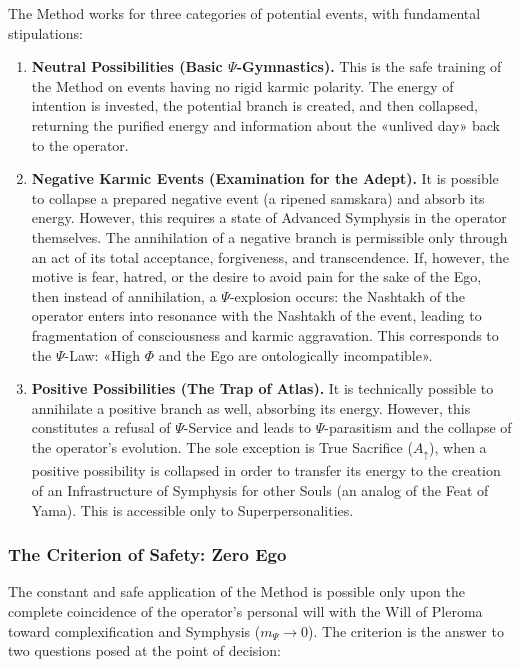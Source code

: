 \documentclass[a4paper,12pt]{article}
\begin{document}
	The Method works for three categories of potential events, with fundamental stipulations:
	
	\begin{enumerate}
		\item \textbf{Neutral Possibilities (Basic $\Psi$-Gymnastics).} This is the safe training of the Method on events having no rigid karmic polarity. The energy of intention is invested, the potential branch is created, and then collapsed, returning the purified energy and information about the «unlived day» back to the operator.
		
		\item \textbf{Negative Karmic Events (Examination for the Adept).} It is possible to collapse a prepared negative event (a ripened samskara) and absorb its energy. However, this requires a state of Advanced Symphysis in the operator themselves. The annihilation of a negative branch is permissible only through an act of its total acceptance, forgiveness, and transcendence. If, however, the motive is fear, hatred, or the desire to avoid pain for the sake of the Ego, then instead of annihilation, a $\Psi$-explosion occurs: the Nashtakh of the operator enters into resonance with the Nashtakh of the event, leading to fragmentation of consciousness and karmic aggravation. This corresponds to the $\Psi$-Law: «High $\Phi$ and the Ego are ontologically incompatible».
		
		\item \textbf{Positive Possibilities (The Trap of Atlas).} It is technically possible to annihilate a positive branch as well, absorbing its energy. However, this constitutes a refusal of $\Psi$-Service and leads to $\Psi$-parasitism and the collapse of the operator's evolution. The sole exception is True Sacrifice ($A_{\uparrow}$), when a positive possibility is collapsed in order to transfer its energy to the creation of an Infrastructure of Symphysis for other Souls (an analog of the Feat of Yama). This is accessible only to Superpersonalities.
	\end{enumerate}
	
	\subsubsection{The Criterion of Safety: Zero Ego}
	
	The constant and safe application of the Method is possible only upon the complete coincidence of the operator's personal will with the Will of Pleroma toward complexification and Symphysis ($m_{\Psi} \to 0$). The criterion is the answer to two questions posed at the point of decision:
	
\end{document}
